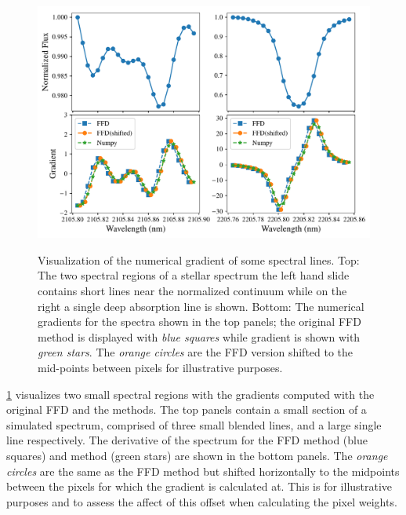 \begin{figure}
    \centering
    \includegraphics[width=0.85\linewidth]{figures/information-content/spectral_gradients}\\
    \caption[Comparing of numerical gradient alogithms.]{Visualization of the numerical gradient of some spectral lines.
        Top: The two spectral regions of a stellar spectrum the left hand slide contains short lines near the normalized continuum while on the right a single deep absorption line is shown.
        Bottom: The numerical gradients for the spectra shown in the top panels; the original {FFD} method is displayed with \emph{blue squares} while \numpy{} gradient is shown with \emph{green stars}.
        The \emph{orange circles} are the {FFD} version shifted to the mid-points between pixels for illustrative purposes.}
    \label{fig:gradients}
\end{figure}




\cref{fig:gradients} visualizes two small spectral regions with the gradients computed with the original {FFD} and the \npgradient{} methods.
The top panels contain a small section of a simulated spectrum, comprised of three small blended lines, and a large single line respectively.
The derivative of the spectrum for the {FFD} method (blue squares) and \npgradient{} method (green stars) are shown in the bottom panels.
The \emph{orange circles} are the same as the {FFD} method but shifted horizontally to the midpoints between the pixels for which the gradient is calculated at.
This is for illustrative purposes and to assess the affect of this offset when calculating the pixel weights.

